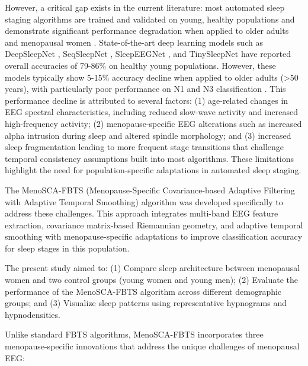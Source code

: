 \documentclass[ASNA,twocolumn]{USG}
\begin{document}
However, a critical gap exists in the current literature: most automated sleep staging algorithms are trained and validated on young, healthy populations and demonstrate significant performance degradation when applied to older adults and menopausal women \cite{Phan2022}. State-of-the-art deep learning models such as DeepSleepNet \cite{Supratak2017}, SeqSleepNet \cite{Phan2019}, SleepEEGNet \cite{Supratak2018}, and TinySleepNet \cite{Perslev2021} have reported overall accuracies of 79-86\% on healthy young populations. However, these models typically show 5-15\% accuracy decline when applied to older adults (\textgreater{}50 years), with particularly poor performance on N1 and N3 classification \cite{Chambon2018, Eldele2021}. This performance decline is attributed to several factors: (1) age-related changes in EEG spectral characteristics, including reduced slow-wave activity and increased high-frequency activity; (2) menopause-specific EEG alterations such as increased alpha intrusion during sleep and altered spindle morphology; and (3) increased sleep fragmentation leading to more frequent stage transitions that challenge temporal consistency assumptions built into most algorithms. These limitations highlight the need for population-specific adaptations in automated sleep staging.

The MenoSCA-FBTS (Menopause-Specific Covariance-based Adaptive Filtering with Adaptive Temporal Smoothing) algorithm was developed specifically to address these challenges. This approach integrates multi-band EEG feature extraction, covariance matrix-based Riemannian geometry, and adaptive temporal smoothing with menopause-specific adaptations to improve classification accuracy for sleep stages in this population.

The present study aimed to: (1) Compare sleep architecture between menopausal women and two control groups (young women and young men); (2) Evaluate the performance of the MenoSCA-FBTS algorithm across different demographic groups; and (3) Visualize sleep patterns using representative hypnograms and hypnodensities.

Unlike standard FBTS algorithms, MenoSCA-FBTS incorporates three menopause-specific innovations that address the unique challenges of menopausal EEG:
\end{document}
